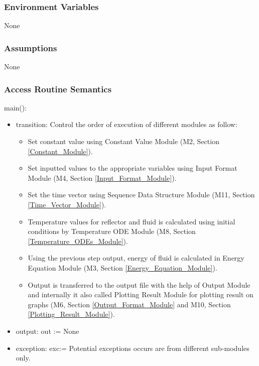 \documentclass[12pt, titlepage]{article}
\begin{document}
\subsubsection{Environment Variables}

None

\subsubsection{Assumptions}

None

\subsubsection{Access Routine Semantics}

\noindent main():
\begin{itemize}
\item transition: Control the order of execution of different modules as follow: \\
\begin{itemize}
    \item Set constant value using Constant Value Module (M2, Section \ref{Constant_Module}). 
    \item Set inputted values to the appropriate variables using Input Format Module (M4, Section \ref{Input_Format_Module}). 
    \item Set the time vector using Sequence Data Structure Module (M11, Section \ref{Time_Vector_Module}).
    \item Temperature values for reflector and fluid is calculated using initial conditions by Temperature ODE Module (M8, Section \ref{Temperature_ODEs_Module}). 
    \item Using the previous step output, energy of fluid is calculated in Energy Equation Module (M3, Section \ref{Energy_Equation_Module}).
    \item Output is transferred to the output file with the help of Output Module and internally it also called Plotting Result Module for plotting result on graphs (M6, Section \ref{Output_Format_Module} and M10, Section \ref{Plotting_Result_Module}). 
     
\end{itemize}
\item output: out := None 
\item exception: exc:= Potential exceptions occurs are from different sub-modules only.   
\end{itemize}
\end{document}
